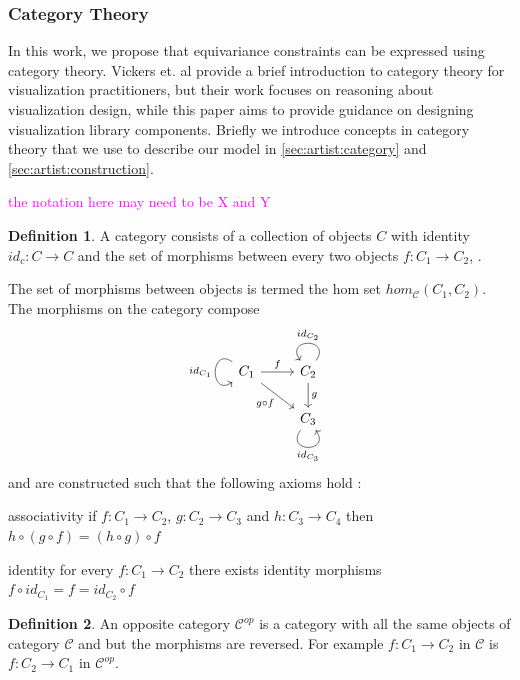 \documentclass[10pt,journal,compsoc]{IEEEtran}
\newcommand{\note}[1]{\textcolor{magenta}{#1}}
\theoremstyle{definition}
\newtheorem{definition}{Definition}[section]
\theoremstyle{remark}
\begin{document}
\subsubsection{Category Theory}
\label{sec:related-work:equivariance:category}
In this work, we propose that equivariance constraints can be expressed using category theory. Vickers et. al \cite{vickersUnderstandingVisualizationFormal2013} provide a brief introduction to category theory for visualization practitioners, but their work focuses on reasoning about visualization design, while this paper aims to provide guidance on designing visualization library components. Briefly we introduce concepts in category theory that we use to describe our model in \autoref{sec:artist:category} and \autoref{sec:artist:construction}. 

\note{the notation here may need to be X and Y}

\begin{definition} A category  consists of a collection of objects $C$ with identity $id_c: C\rightarrow C$ and the set of morphisms between every two objects $f:C_1 \rightarrow C_2$, \cite{fongInvitationAppliedCategory2019,maclaneCategoriesWorkingMathematician2013}. 
\end{definition}
The set of morphisms between objects is termed the hom set $hom_{\mathcal{C}}(C_1, C_2)$. The morphisms on the category  compose
\begin{equation*}
  \begin{tikzcd}
    C_1 \arrow[r, "f"] \arrow[rd, "g\circ f"'] \arrow["id_{C_1}"', loop, distance=2em, in=215, out=145] & C_2 \arrow[d, "g"] \arrow["id_{C_2}"', loop, distance=2em, in=125, out=55] \\
  & C_3 \arrow["id_{C_3}"', loop, distance=2em, in=305, out=235]              
  \end{tikzcd}
\end{equation*}
 and are constructed such that the following axioms hold \cite{riehlCategoryTheoryContext}:
 \begin{LaTeXdescription}
   \item[associativity] if $f: C_1 \rightarrow C_2$, $g: C_2 \rightarrow C_3$ and $h: C_3 \rightarrow C_4$ then $h\circ (g \circ f) = (h \circ g) \circ f$
   \item[identity] for every $f: C_1 \rightarrow C_2$ there exists identity morphisms $f \circ id_{C_1} = f = id_{C_2} \circ f$
 \end{LaTeXdescription}

 \begin{definition} An opposite category $\mathcal{C}^{op}$ is a category with all the same objects of category $\mathcal{C}$ and but the morphisms are reversed. For example $f:C_1 \rightarrow C_2$ in $\mathcal{C}$ is $f:C_2 \rightarrow C_1$ in $\mathcal{C}^{op}$.   
 \end{definition}
\end{document}
